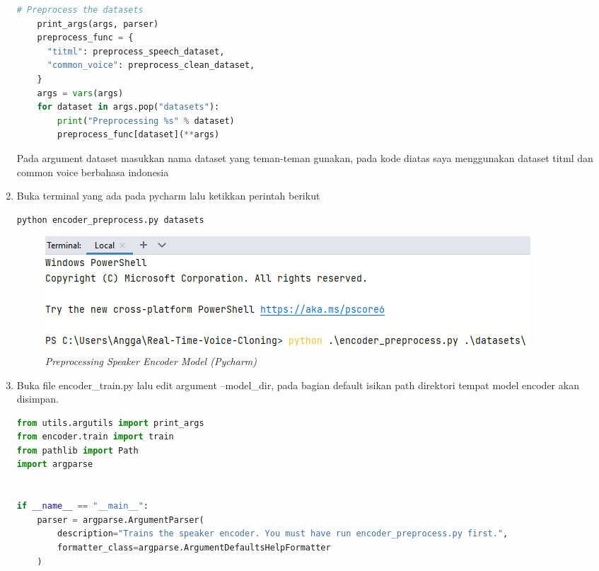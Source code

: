 \begin{enumerate}
\begin{lstlisting}[language=Python, caption=Preprocessing Encoder Model (Pycharm), label=lstencoder]
    # Preprocess the datasets
    print_args(args, parser)
    preprocess_func = {
      "titml": preprocess_speech_dataset,
      "common_voice": preprocess_clean_dataset, 
    }
    args = vars(args)
    for dataset in args.pop("datasets"):
        print("Preprocessing %s" % dataset)
        preprocess_func[dataset](**args)
\end{lstlisting}

Pada argument dataset masukkan nama dataset yang teman-teman gunakan, pada kode diatas saya menggunakan dataset titml dan common voice berbahasa indonesia

\item Buka terminal yang ada pada pycharm lalu ketikkan perintah berikut
\begin{lstlisting}[language=Python, caption=Script to Run Preprocessing Speaker Encoder Model (Pycharm)]
python encoder_preprocess.py datasets
\end{lstlisting}

\begin{figure}[H]
    \centering
    \includegraphics[scale=0.5]{figures/dataset1}
    \caption{\textit{Preprocessing Speaker Encoder Model (Pycharm)}}
    \label{dataset1}
\end{figure}

\item Buka file encoder\_train.py lalu edit argument --model\_dir, pada bagian default isikan path direktori tempat model encoder akan disimpan.

\begin{lstlisting}[language=Python, caption=Training Speaker Encoder Model (Pycharm)]
from utils.argutils import print_args
from encoder.train import train
from pathlib import Path
import argparse


if __name__ == "__main__":
    parser = argparse.ArgumentParser(
        description="Trains the speaker encoder. You must have run encoder_preprocess.py first.",
        formatter_class=argparse.ArgumentDefaultsHelpFormatter
    )
    

\end{lstlisting}
\end{enumerate}
